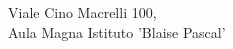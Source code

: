 \documentclass[preview]{standalone}
\begin{document}
\begin{center}
Viale Cino Macrelli 100,\\Aula Magna Istituto 'Blaise Pascal'
\end{center}
\end{document}
